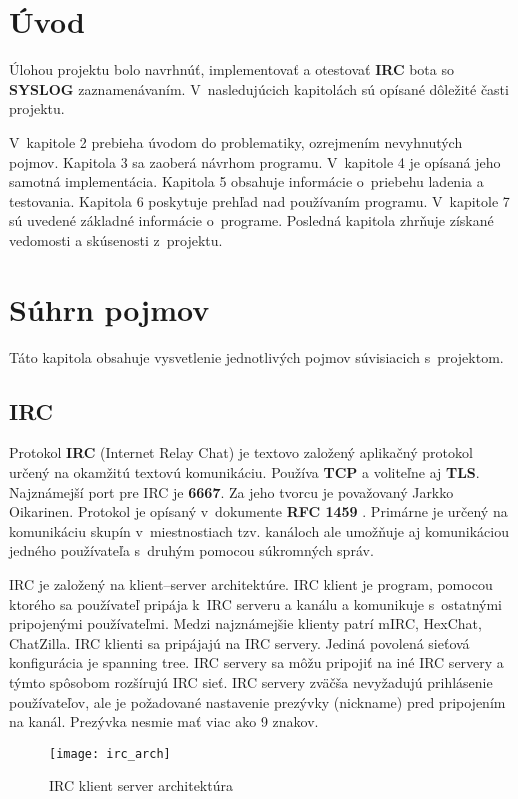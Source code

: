 \chapter{Úvod}
Úlohou projektu bolo navrhnúť, implementovať a otestovať \textbf{IRC} bota so \textbf{SYSLOG} zaznamenávaním. V~nasledujúcich kapitolách sú opísané dôležité časti projektu.

V~kapitole 2 prebieha úvodom do problematiky, ozrejmením nevyhnutých pojmov. Kapitola 3 sa zaoberá návrhom programu. V~kapitole 4 je opísaná jeho samotná implementácia. Kapitola 5 obsahuje informácie o~priebehu ladenia a testovania. Kapitola 6 poskytuje prehľad nad používaním programu. V~kapitole 7 sú uvedené základné informácie o~programe. Posledná kapitola zhrňuje získané vedomosti a skúsenosti z~projektu.
 

\chapter{Súhrn pojmov}
Táto kapitola obsahuje vysvetlenie jednotlivých pojmov súvisiacich s~projektom.

\section{IRC}
Protokol \textbf{IRC} (Internet Relay Chat) je textovo založený aplikačný protokol určený na okamžitú textovú komunikáciu. Používa \textbf{TCP} a voliteľne aj \textbf{TLS}. Najznámejší port pre IRC je \textbf{6667}. Za jeho tvorcu je považovaný Jarkko Oikarinen. Protokol je opísaný v~dokumente \textbf{RFC 1459} \cite{rfc1459}. Primárne je určený na komunikáciu skupín v~miestnostiach tzv. kanáloch ale umožňuje aj komunikáciou jedného používateľa s~druhým pomocou súkromných správ.

IRC je založený na klient--server architektúre. IRC klient je program, pomocou ktorého sa používateľ pripája k~IRC serveru a kanálu a komunikuje s~ostatnými pripojenými používateľmi. Medzi najznámejšie klienty patrí mIRC, HexChat, ChatZilla. IRC klienti sa pripájajú na IRC servery. Jediná povolená sieťová konfigurácia je spanning tree. IRC servery sa môžu pripojiť na iné IRC servery a týmto spôsobom rozšírujú IRC sieť. IRC servery zväčša nevyžadujú prihlásenie používateľov, ale je požadované nastavenie prezývky (nickname) pred pripojením na kanál. Prezývka nesmie mať viac ako 9 znakov.

\begin{figure}[h]
	\texttt{[image: irc\_arch]}
	\caption{IRC klient server architektúra}
\end{figure}


